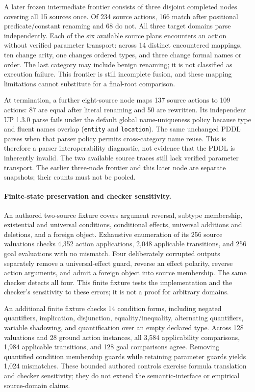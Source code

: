 \documentclass[letterpaper]{article}
\begin{document}
A later frozen intermediate frontier consists of three disjoint completed nodes covering all 15 sources once. Of 234 source actions, 166 match after positional predicate/constant renaming and 68 do not. All three target domains parse independently. Each of the six available source plans encounters an action without verified parameter transport: across 14 distinct encountered mappings, ten change arity, one changes ordered types, and three change formal names or order. The last category may include benign renaming; it is not classified as execution failure. This frontier is still incomplete fusion, and these mapping limitations cannot substitute for a final-root comparison.

At termination, a further eight-source node maps 137 source actions to 109 actions: 87 are equal after literal renaming and 50 are rewritten. Its independent UP 1.3.0 parse fails under the default global name-uniqueness policy because type and fluent names overlap (\texttt{entity} and \texttt{location}). The same unchanged PDDL parses when that parser policy permits cross-category name reuse. This is therefore a parser interoperability diagnostic, not evidence that the PDDL is inherently invalid. The two available source traces still lack verified parameter transport. The earlier three-node frontier and this later node are separate snapshots; their counts must not be pooled.

\paragraph{Finite-state preservation and checker sensitivity.}
An authored two-source fixture covers argument reversal, subtype membership, existential and universal conditions, conditional effects, universal additions and deletions, and a foreign object. Exhaustive enumeration of its 256 source valuations checks 4,352 action applications, 2,048 applicable transitions, and 256 goal evaluations with no mismatch. Four deliberately corrupted outputs separately remove a universal-effect guard, reverse an effect polarity, reverse action arguments, and admit a foreign object into source membership. The same checker detects all four. This finite fixture tests the implementation and the checker's sensitivity to these errors; it is not a proof for arbitrary domains.

An additional finite fixture checks 14 condition forms, including negated quantifiers, implication, disjunction, equality/inequality, alternating quantifiers, variable shadowing, and quantification over an empty declared type. Across 128 valuations and 28 ground action instances, all 3,584 applicability comparisons, 1,984 applicable transitions, and 128 goal comparisons agree. Removing quantified condition membership guards while retaining parameter guards yields 1,024 mismatches. These bounded authored controls exercise formula translation and checker sensitivity; they do not extend the semantic-interface or empirical source-domain claims.
\end{document}
